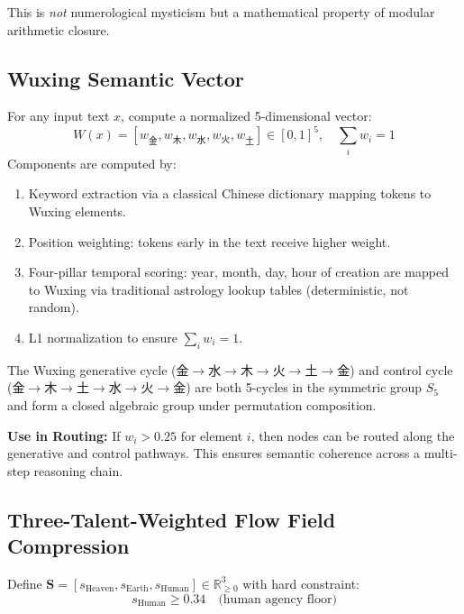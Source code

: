 \documentclass[twocolumn]{article}
\begin{document}
This is \emph{not} numerological mysticism but a mathematical property of modular arithmetic closure.

\subsection{Wuxing Semantic Vector}

\begin{definition}
For any input text $x$, compute a normalized 5-dimensional vector:
\[
W(x) = [w_{\text{金}}, w_{\text{木}}, w_{\text{水}}, w_{\text{火}}, w_{\text{土}}] \in [0,1]^5, \quad \sum_i w_i = 1
\]
Components are computed by:
\begin{enumerate}
  \item Keyword extraction via a classical Chinese dictionary mapping tokens to Wuxing elements.
  \item Position weighting: tokens early in the text receive higher weight.
  \item Four-pillar temporal scoring: year, month, day, hour of creation are mapped to Wuxing via traditional astrology lookup tables (deterministic, not random).
  \item L1 normalization to ensure $\sum_i w_i = 1$.
\end{enumerate}
\end{definition}

\begin{theorem}
The Wuxing generative cycle ($\text{金} \to \text{水} \to \text{木} \to \text{火} \to \text{土} \to \text{金}$) and control cycle ($\text{金} \to \text{木} \to \text{土} \to \text{水} \to \text{火} \to \text{金}$) are both 5-cycles in the symmetric group $S_5$ and form a closed algebraic group under permutation composition.
\end{theorem}

\textbf{Use in Routing:} If $w_i > 0.25$ for element $i$, then nodes can be routed along the generative and control pathways. This ensures semantic coherence across a multi-step reasoning chain.

\subsection{Three-Talent-Weighted Flow Field Compression}

\begin{definition}
Define $\mathbf{S} = [s_{\text{Heaven}}, s_{\text{Earth}}, s_{\text{Human}}] \in \mathbb{R}^3_{\geq 0}$ with hard constraint:
\[
s_{\text{Human}} \geq 0.34 \quad \text{(human agency floor)}
\]
\end{definition}
\end{document}
